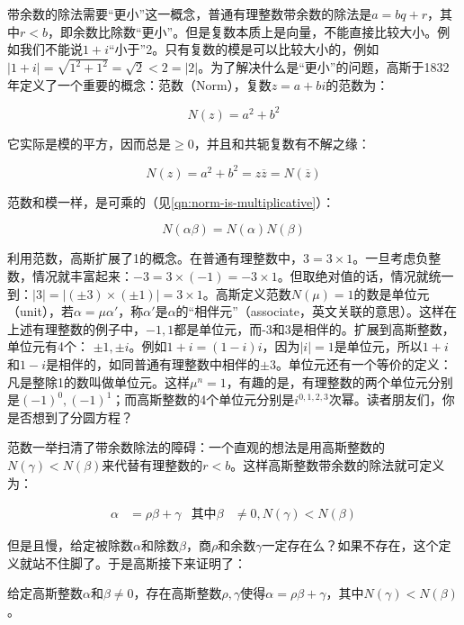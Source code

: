 \documentclass[b5paper]{ctexart}
\begin{document}
带余数的除法需要“更小”这一概念，普通有理整数带余数的除法是$a = bq + r$，其中$r < b$，即余数比除数“更小”。但是复数本质上是向量，不能直接比较大小。例如我们不能说$1 + i$“小于”2。只有复数的模是可以比较大小的，例如$|1 + i| = \sqrt{1^2 + 1^2} = \sqrt{2} < 2 = |2|$。为了解决什么是“更小”的问题，高斯于1832年定义了一个重要的概念：范数（Norm），复数$z = a + bi$的范数为：

\[
N(z) = a^2 + b^2
\]

它实际是模的平方，因而总是$\geq 0$，并且和共轭复数有不解之缘：

\[
N(z) = a^2 + b^2 = z\overline{z} = N(\overline{z})
\]

范数和模一样，是可乘的（见\cref{qn:norm-is-multiplicative}）：

\[
N(\alpha\beta) = N(\alpha)N(\beta)
\]

利用范数，高斯扩展了1的概念。在普通有理整数中，$3 = 3 \times 1$。一旦考虑负整数，情况就丰富起来：$-3 = 3 \times (-1) = -3 \times 1$。但取绝对值的话，情况就统一到：$|3| = |(\pm 3) \times (\pm 1)| = 3 \times 1$。高斯定义范数$N(\mu) = 1$的数是单位元（unit），若$\alpha = \mu \alpha'$，称$\alpha'$是$\alpha$的“相伴元”（associate，英文关联的意思）。这样在上述有理整数的例子中，$-1, 1$都是单位元，而-3和3是相伴的。扩展到高斯整数，单位元有4个：
$\pm 1, \pm i$。例如$1 + i = (1 - i)i$，因为$|i| = 1$是单位元，所以$1 + i$和$1 - i$是相伴的，如同普通有理整数中相伴的$\pm 3$。单位元还有一个等价的定义：凡是整除1的数叫做单位元。这样$\mu^n = 1$，有趣的是，有理整数的两个单位元分别是$(-1)^0, (-1)^1$；而高斯整数的4个单位元分别是$i^{0, 1, 2, 3}$次幂。读者朋友们，你是否想到了分圆方程？

范数一举扫清了带余数除法的障碍：一个直观的想法是用高斯整数的$N(\gamma) < N(\beta)$来代替有理整数的$r < b$。这样高斯整数带余数的除法就可定义为：

\begin{align*}
\alpha &= \rho \beta + \gamma & \text{其中} \beta &\ne 0, N(\gamma) < N(\beta)
\end{align*}

但是且慢，给定被除数$\alpha$和除数$\beta$，商$\rho$和余数$\gamma$一定存在么？如果不存在，这个定义就站不住脚了。于是高斯接下来证明了：

\begin{theorem}
给定高斯整数$\alpha$和$\beta \ne 0$，存在高斯整数$\rho, \gamma$使得$\alpha = \rho \beta + \gamma$，其中$N(\gamma) < N(\beta)$。
\end{theorem}
\end{document}
